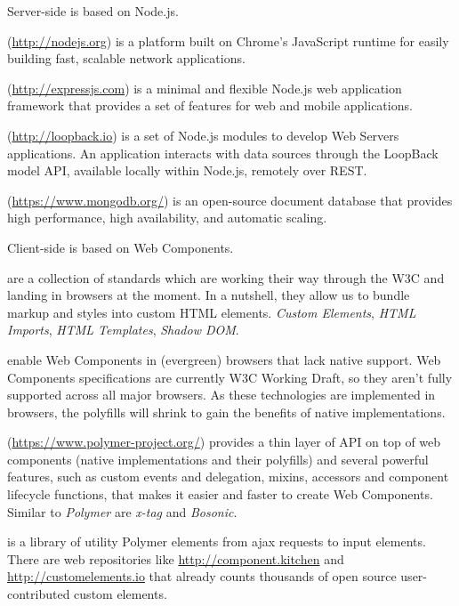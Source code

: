 \documentclass{sig-alternate}
\begin{document}
Server-side is based on Node.js.

\begin{description}
\itemsep1pt\parskip0pt
        \item[Node.js] (\url{http://nodejs.org}) is a platform built on Chrome's JavaScript runtime for easily building fast, scalable network applications.
        \item[Express.js] (\url{http://expressjs.com}) is a minimal and flexible Node.js web application framework that provides a set of features for web and mobile applications.
        \item[Loopback] (\url{http://loopback.io}) is a set of Node.js modules to develop Web Servers applications. An application interacts with data sources through the LoopBack model API, available locally within Node.js, remotely over REST.
        \item[MongoDB] (\url{https://www.mongodb.org/}) is an open-source document database that provides high performance, high availability, and automatic scaling.
\end{description}


Client-side is based on Web Components.

\begin{description}
\itemsep1pt\parskip0pt
        \item[Web Components] are a collection of standards which are working their way through the W3C and landing in browsers at the moment. In a nutshell, they allow us to bundle markup and styles into custom HTML elements.
\emph{Custom Elements}\cite{custom-elements}, \emph{HTML Imports}\cite{html-imports}, \emph{HTML Templates}\cite{html-templates}, \emph{Shadow DOM}\cite{shadow-dom}.
        \item[webcomponent.js polyfills] enable Web Components in (evergreen) browsers that lack native support.
Web Components specifications are currently W3C Working Draft, so they aren’t fully supported across all major browsers.
As these technologies are implemented in browsers, the polyfills will shrink to gain the benefits of native implementations. \cite{webcomponents-polyfills} 
        \item[Polymer library] (\url{https://www.polymer-project.org/}) provides a thin layer of API on top of web components (native implementations and their polyfills) and several powerful features, such as custom events and delegation, mixins, accessors and component lifecycle functions, that makes it easier and faster to create Web Components. Similar to \emph{Polymer} are \emph{x-tag} and \emph{Bosonic}.
        \item[iron-elements] \cite{iron-elements} is a library of utility Polymer elements from ajax requests to input elements. 
There are web repositories like \url{http://component.kitchen} and \url{http://customelements.io} that already counts thousands of open source user-contributed custom elements.
\end{description}
\end{document}
